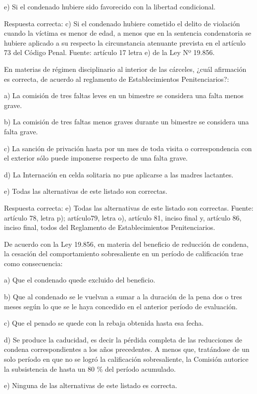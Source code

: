 \documentclass[letterpaper, 11pt]{article}
\begin{document}
e) Si el condenado hubiere sido favorecido con la libertad condicional.

Respuesta correcta:
c) Si el condenado hubiere cometido el delito de violación cuando la
víctima es menor de edad, a menos que en la sentencia condenatoria se hubiere aplicado
a su respecto la circunstancia atenuante prevista en el artículo 73 del Código Penal.
Fuente: artículo 17 letra e) de la Ley Nº 19.856.

En materias de régimen disciplinario al interior de las cárceles, ¿cuál afirmación es
correcta, de acuerdo al reglamento de Establecimientos Penitenciarios?:

a) La comisión de tres faltas leves en un bimestre se considera una falta menos grave.

b) La comisión de tres faltas menos graves durante un bimestre se considera una falta grave.

c) La sanción de privación hasta por un mes de toda visita o correspondencia con el exterior
sólo puede imponerse respecto de una falta grave.

d) La Internación en celda solitaria no pue aplicarse a las madres lactantes.

e) Todas las alternativas de este listado son correctas.

Respuesta correcta:
e) Todas las alternativas de este listado son correctas.
Fuente: artículo 78, letra p); artículo79, letra o), artículo 81, inciso final y, artículo 86,
inciso final, todos del Reglamento de Establecimientos Penitenciarios.

De acuerdo con la Ley 19.856, en materia del beneficio de reducción de condena, la
cesación del comportamiento sobresaliente en un período de calificación trae como
consecuencia:

a) Que el condenado quede excluido del beneficio.

b) Que al condenado se le vuelvan a sumar a la duración de la pena dos o tres meses según
lo que se le haya concedido en el anterior período de evaluación.

c) Que el penado se quede con la rebaja obtenida hasta esa fecha.

d) Se produce la caducidad, es decir la pérdida completa de las reducciones de condena
correspondientes a los años precedentes. A menos que, tratándose de un solo período en
que no se logró la calificación sobresaliente, la Comisión autorice la subsistencia de hasta
un 80 \% del período acumulado.

e) Ninguna de las alternativas de este listado es correcta.
\end{document}
